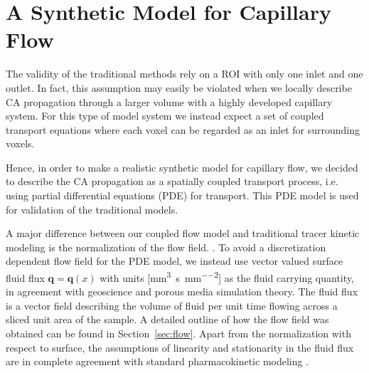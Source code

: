 \documentclass[journal,twocolumn]{IEEEtran}
\newcommand{\vq}{\mathbf{q}}
\newcommand{\siQmm}{\milli\meter\cubed\per\second\per\milli\meter\cubed}
\newcommand{\siq}{\milli\meter\cubed\per\second\per\milli\meter\squared}
\begin{document}
	
	
	\section{A Synthetic Model for Capillary Flow}\label{sec:synthetic}

	The validity of the traditional methods rely on a ROI with only one inlet and one outlet.
	In fact, this assumption may easily be violated when we locally describe CA propagation through a larger volume with a highly developed capillary system.
	For this type of model system we instead expect a set of coupled transport equations where each voxel can be regarded as an inlet for surrounding voxels.

	Hence, in order to make a realistic synthetic model for capillary flow, we decided to describe the CA propagation as a spatially coupled transport process, i.e. using partial differential equations (PDE) for transport. This PDE model is used for validation of the traditional models. 

	
	A major difference between our coupled flow model and traditional tracer kinetic modeling is the normalization of the flow field.
.
	To avoid a discretization dependent flow field for the PDE model, we instead use vector valued surface fluid flux $\vq = \vq(x)$ with units [\si{\siq}] as the fluid carrying quantity, in agreement with geoscience and porous media simulation theory.
	The fluid flux is a vector field describing the volume of fluid per unit time flowing across a sliced unit area of the sample.
	A detailed outline of how the flow field was obtained can be found in Section~\ref{sec:flow}.
	Apart from the normalization with respect to surface, the assumptions of linearity and stationarity in the fluid flux are in complete agreement with standard pharmacokinetic modeling \cite{sourbron13}.



			

\end{document}
